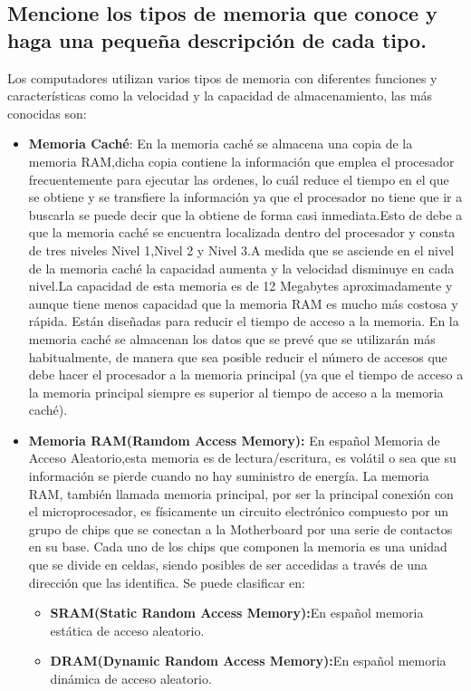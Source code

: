 \documentclass{article}
\begin{document}
\subsection{Mencione los tipos de memoria que conoce y haga una pequeña descripción de cada tipo.}
Los computadores utilizan varios tipos de memoria con diferentes funciones y características como la velocidad y la capacidad de almacenamiento, las más conocidas son:
\begin{itemize}
\item \textbf{Memoria Caché}:
    En la memoria caché se almacena una copia de la memoria RAM,dicha copia contiene la información que  emplea el procesador frecuentemente para ejecutar las ordenes, lo cuál reduce el tiempo en el que se obtiene y se transfiere la información ya que el procesador no tiene que ir a buscarla se puede decir que la obtiene de forma casi inmediata.Esto de debe a que la memoria caché se encuentra localizada dentro del procesador y
    consta de tres niveles Nivel 1,Nivel 2 y Nivel 3.A medida que se asciende en el nivel de la memoria caché la capacidad aumenta y la velocidad disminuye en cada nivel.La capacidad de esta memoria  es de 12 Megabytes aproximadamente y aunque tiene menos capacidad que la memoria RAM es mucho más costosa y rápida\cite{ref}.\newline
    Están diseñadas para reducir el tiempo de acceso a la memoria. En la memoria caché se almacenan los datos que se prevé que se utilizarán más habitualmente, de manera que sea posible reducir el número de accesos que debe hacer el procesador a la memoria principal (ya que el tiempo de acceso a la memoria principal siempre es superior al tiempo de acceso a la memoria caché)\cite{Orenga}.

    \item \textbf{Memoria RAM(Ramdom Access Memory): }En español Memoria de Acceso Aleatorio,esta memoria es de lectura/escritura, es volátil o sea que su información se pierde cuando no hay suministro de energía.
    La memoria RAM, también llamada memoria principal, por ser la principal conexión con el microprocesador, es físicamente un circuito electrónico compuesto por un grupo de chips que se conectan a la Motherboard por una serie de contactos en su base. Cada uno de los chips que componen la memoria es una unidad que se divide en celdas, siendo posibles de ser accedidas a través de una dirección que las identifica\cite{ram}.
    \newline
    Se puede clasificar en:
    \begin{itemize}
        \item\textbf{SRAM(Static Random Access Memory):}En español memoria estática de acceso aleatorio.
        \item\textbf{DRAM(Dynamic Random Access Memory):}En español memoria dinámica de acceso aleatorio.
    \end{itemize}
    

\end{itemize}
\end{document}
